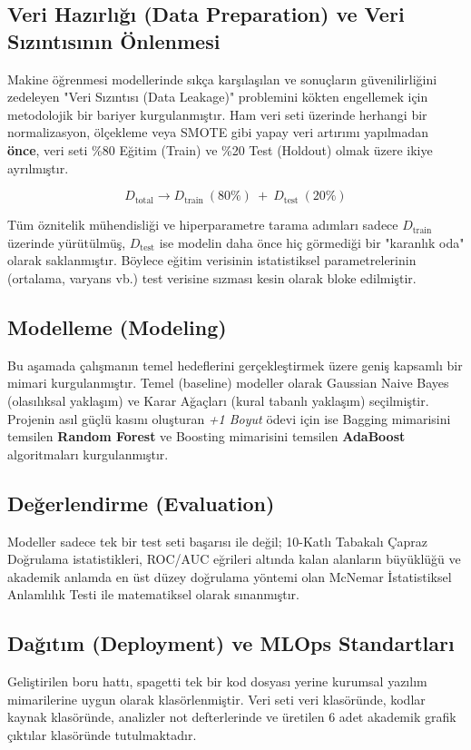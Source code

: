 \documentclass[12pt,a4paper]{article}
\begin{document}
\subsection{Veri Hazırlığı (Data Preparation) ve Veri Sızıntısının Önlenmesi}
Makine öğrenmesi modellerinde sıkça karşılaşılan ve sonuçların güvenilirliğini zedeleyen "Veri Sızıntısı (Data Leakage)" problemini kökten engellemek için metodolojik bir bariyer kurgulanmıştır. Ham veri seti üzerinde herhangi bir normalizasyon, ölçekleme veya SMOTE gibi yapay veri artırımı yapılmadan \textbf{önce}, veri seti \%80 Eğitim (Train) ve \%20 Test (Holdout) olmak üzere ikiye ayrılmıştır.

\begin{equation}
    D_{\text{total}} \longrightarrow D_{\text{train}} \ (80\%) \ + \ D_{\text{test}} \ (20\%)
\end{equation}

Tüm öznitelik mühendisliği ve hiperparametre tarama adımları sadece $D_{\text{train}}$ üzerinde yürütülmüş, $D_{\text{test}}$ ise modelin daha önce hiç görmediği bir "karanlık oda" olarak saklanmıştır. Böylece eğitim verisinin istatistiksel parametrelerinin (ortalama, varyans vb.) test verisine sızması kesin olarak bloke edilmiştir.

\subsection{Modelleme (Modeling)}
Bu aşamada çalışmanın temel hedeflerini gerçekleştirmek üzere geniş kapsamlı bir mimari kurgulanmıştır. Temel (baseline) modeller olarak Gaussian Naive Bayes (olasılıksal yaklaşım) ve Karar Ağaçları (kural tabanlı yaklaşım) seçilmiştir. Projenin asıl güçlü kasını oluşturan \textit{+1 Boyut} ödevi için ise Bagging mimarisini temsilen \textbf{Random Forest} ve Boosting mimarisini temsilen \textbf{AdaBoost} algoritmaları kurgulanmıştır.

\subsection{Değerlendirme (Evaluation)}
Modeller sadece tek bir test seti başarısı ile değil; 10-Katlı Tabakalı Çapraz Doğrulama istatistikleri, ROC/AUC eğrileri altında kalan alanların büyüklüğü ve akademik anlamda en üst düzey doğrulama yöntemi olan McNemar İstatistiksel Anlamlılık Testi ile matematiksel olarak sınanmıştır.

\subsection{Dağıtım (Deployment) ve MLOps Standartları}
Geliştirilen boru hattı, spagetti tek bir kod dosyası yerine kurumsal yazılım mimarilerine uygun olarak klasörlenmiştir. Veri seti veri klasöründe, kodlar kaynak klasöründe, analizler not defterlerinde ve üretilen 6 adet akademik grafik çıktılar klasöründe tutulmaktadır.
\end{document}
